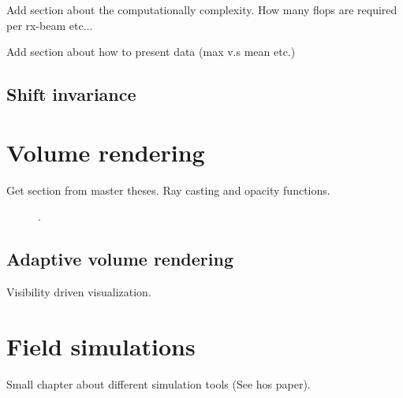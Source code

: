 Add section about the computationally complexity. How many flops are required per rx-beam etc...

Add section about how to present data (max v.s mean etc.)
						
\subsection{Shift invariance}

\section{Volume rendering}\label{sec:volren}

Get section from master theses. Ray casting and opacity functions.

\begin{figure}
\centering
{}
\caption{.}
\label{fig:vr}
\end{figure}

\subsection{Adaptive volume rendering}

Visibility driven visualization.

\section{Field simulations}\label{sec:field}

Small chapter about different simulation tools (See hos paper).
			
\endinput
